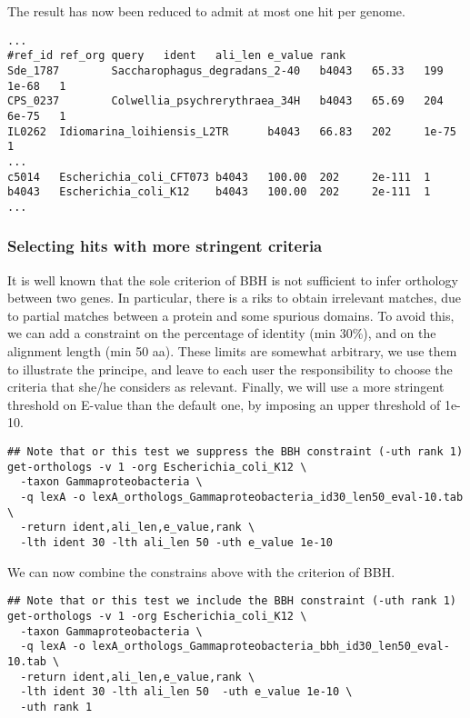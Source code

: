 The result has now been reduced to admit at most one hit per genome.

\begin{scriptsize}
\begin{verbatim}
...
#ref_id ref_org query   ident   ali_len e_value rank
Sde_1787        Saccharophagus_degradans_2-40   b4043   65.33   199     1e-68   1
CPS_0237        Colwellia_psychrerythraea_34H   b4043   65.69   204     6e-75   1
IL0262  Idiomarina_loihiensis_L2TR      b4043   66.83   202     1e-75   1
...
c5014   Escherichia_coli_CFT073 b4043   100.00  202     2e-111  1
b4043   Escherichia_coli_K12    b4043   100.00  202     2e-111  1
...
\end{verbatim}
\end{scriptsize}

\subsubsection{Selecting hits with more stringent criteria}

It is well known that the sole criterion of BBH is not sufficient to
infer orthology between two genes. In particular, there is a riks to
obtain irrelevant matches, due to partial matches between a protein
and some spurious domains. To avoid this, we can add a constraint on
the percentage of identity (min 30\%), and on the alignment length
(min 50 aa). These limits are somewhat arbitrary, we use them to
illustrate the principe, and leave to each user the responsibility to
choose the criteria that she/he considers as relevant. Finally, we
will use a more stringent threshold on E-value than the default one,
by imposing an upper threshold of 1e-10.

\begin{small}
\begin{verbatim}
## Note that or this test we suppress the BBH constraint (-uth rank 1)
get-orthologs -v 1 -org Escherichia_coli_K12 \
  -taxon Gammaproteobacteria \
  -q lexA -o lexA_orthologs_Gammaproteobacteria_id30_len50_eval-10.tab \
  -return ident,ali_len,e_value,rank \
  -lth ident 30 -lth ali_len 50 -uth e_value 1e-10
\end{verbatim}
\end{small}

We can now combine the constrains above with the criterion of BBH.

\begin{small}
\begin{verbatim}
## Note that or this test we include the BBH constraint (-uth rank 1)
get-orthologs -v 1 -org Escherichia_coli_K12 \
  -taxon Gammaproteobacteria \
  -q lexA -o lexA_orthologs_Gammaproteobacteria_bbh_id30_len50_eval-10.tab \
  -return ident,ali_len,e_value,rank \
  -lth ident 30 -lth ali_len 50  -uth e_value 1e-10 \
  -uth rank 1 
\end{verbatim}
\end{small}

